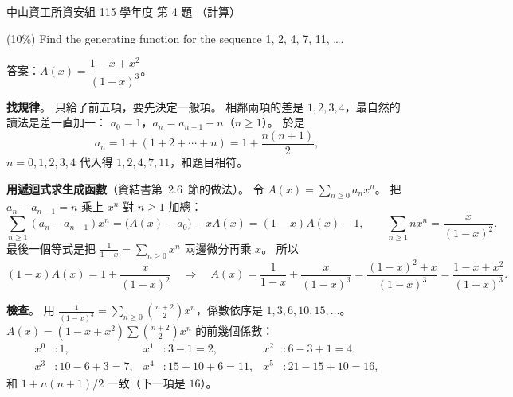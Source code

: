 \begin{pastexam}[label={px:nsysu-115-dmalg-03}]{中山資工所資安組 115 學年度 第 4 題}
（計算）

(10\%) Find the generating function for the sequence 1, 2, 4, 7, 11, \ldots.
\end{pastexam}

\begin{pastsoln}
答案：$A(x) = \dfrac{1 - x + x^2}{(1 - x)^3}$。

\textbf{找規律}。 只給了前五項，要先決定一般項。 相鄰兩項的差是 $1, 2, 3, 4$，最自然的讀法是差一直加一：
$a_0 = 1$，$a_n = a_{n-1} + n$（$n \ge 1$）。 於是
\[
a_n = 1 + (1 + 2 + \cdots + n) = 1 + \frac{n(n+1)}{2},
\]
$n = 0, 1, 2, 3, 4$ 代入得 $1, 2, 4, 7, 11$，和題目相符。

\textbf{用遞迴式求生成函數}（資結書第~2.6~節的做法）。 令 $A(x) = \sum_{n \ge 0} a_n x^n$。 把 $a_n - a_{n-1} = n$
乘上 $x^n$ 對 $n \ge 1$ 加總：
\[
\sum_{n \ge 1} (a_n - a_{n-1}) x^n = \bigl(A(x) - a_0\bigr) - x A(x) = (1 - x) A(x) - 1,
\qquad
\sum_{n \ge 1} n x^n = \frac{x}{(1 - x)^2}.
\]
最後一個等式是把 $\frac{1}{1 - x} = \sum_{n \ge 0} x^n$ 兩邊微分再乘 $x$。 所以
\[
(1 - x) A(x) = 1 + \frac{x}{(1 - x)^2}
\quad\Longrightarrow\quad
A(x) = \frac{1}{1 - x} + \frac{x}{(1 - x)^3} = \frac{(1 - x)^2 + x}{(1 - x)^3} = \frac{1 - x + x^2}{(1 - x)^3}.
\]

\textbf{檢查}。 用 $\frac{1}{(1 - x)^3} = \sum_{n \ge 0} \binom{n + 2}{2} x^n$，係數依序是 $1, 3, 6, 10, 15, \ldots$。
$A(x) = (1 - x + x^2) \sum \binom{n+2}{2} x^n$ 的前幾個係數：
\[
\begin{aligned}
x^0 &: 1, & x^1 &: 3 - 1 = 2, & x^2 &: 6 - 3 + 1 = 4,\\
x^3 &: 10 - 6 + 3 = 7, & x^4 &: 15 - 10 + 6 = 11, & x^5 &: 21 - 15 + 10 = 16,
\end{aligned}
\]
和 $1 + n(n+1)/2$ 一致（下一項是 $16$）。
\end{pastsoln}
